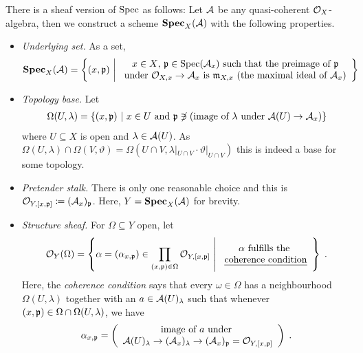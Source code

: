 \documentclass[a4paper,parskip=half,numbers=enddot, DIV=12]{scrreprt}
\begin{document}
There is a sheaf version of $\operatorname{Spec}$ as follows:
Let $\mathcal{A}$ be any quasi-coherent $\mathcal{O}_X$-algebra, then we construct a scheme $\operatorname{\mathbf{Spec}}_X(\mathcal{A})$ with the following properties.
\begin{itemize}
	\item \emph{Underlying set.} As a set,
	\begin{align*}
		\SPEC_X(\Aa) = \left\{(x,\pp) \st 
		\begin{array}{c}
			x\in X\text{, }\pp \in \Spec(\Aa_x) \text{ such that the preimage of }\pp\\
			\text{under } \Oo_{X,x}\morphism \Aa_x \text{ is } \mm_{X,x}\text{ (the maximal ideal of }\Aa_x)
		\end{array}
		\right\}
	\end{align*}
	\item \emph{Topology base.} Let
	\begin{align*}
		\Omega(U,\lambda) = \left\{ (x,\mathfrak{p}) \ \middle|\  x\in U\text{ and }\mathfrak{p}\not\ni (\text{image of } \lambda \text{ under } \mathcal{A}(U)\to \mathcal{A}_x)\right\}
	\end{align*}
	where $U\subseteq X$ is open and $\lambda \in \mathcal{A}(U)$. As $\Omega(U,\lambda) \cap \Omega(V,\vartheta) = \Omega(U\cap V, \lambda|_{U\cap V} \cdot \vartheta|_{U\cap V})$ this is indeed a base for some topology.
	\item \emph{Pretender stalk.} There is only one reasonable choice and this is $\mathcal{O}_{Y,[x,\mathfrak{p}]} \coloneqq (\mathcal{A}_x)_{\mathfrak{p}}$. Here, $Y=\operatorname{\mathbf{Spec}}_X(\mathcal{A})$ for brevity.
	\item \emph{Structure sheaf.} For $\Omega\subseteq Y$ open, let
	\begin{align*}
	\mathcal{O}_Y(\Omega) = \left\{\alpha=(\alpha_{x,\mathfrak{p}})\in \prod_{(x,\mathfrak{p})\in \Omega} \mathcal{O}_{Y,[x,\mathfrak{p}]}\ \middle|\  
	\begin{array}{c}
		\alpha\text{ fulfills the }\\
		\text{\emph{coherence condition}}
	\end{array}
	\right\}\;.
	\end{align*}
	Here, the \emph{coherence condition} says that every $\omega\in \Omega$ has a neighbourhood $\Omega(U,\lambda)$ together with an $a\in \mathcal{A}(U)_\lambda$ such that whenever $(x,\mathfrak{p})\in \Omega\cap \Omega(U,\lambda)$, we have
	\begin{align*}
		\alpha_{x,\pp}=\left(
		\begin{array}{c}
			\text{image of }a\text{ under }\\
			\Aa(U)_\lambda \morphism (\Aa_x)_\lambda \morphism (\Aa_x)_\pp = \Oo_{Y,[x,\pp]}
		\end{array}\right)\;.
	\end{align*}
\end{itemize}
\end{document}
